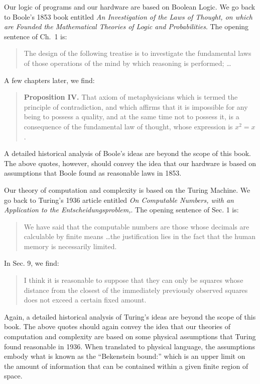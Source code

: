 \documentclass{article}
\begin{document}
Our logic of programs and our hardware are based on Boolean Logic. We go back
to Boole's 1853 book entitled \emph{An Investigation of the Laws of Thought,
  on which are Founded the Mathematical Theories of Logic and
  Probabilities}. The opening sentence of Ch.~1 is:
\begin{quote}
  The design of the following treatise is to investigate the fundamental laws
  of those operations of the mind by which reasoning is performed; \ldots
\end{quote}
A few chapters later, we find:
\begin{quote}
  \textbf{Proposition IV.}  That axiom of metaphysicians which is termed the
  principle of contradiction, and which affirms that it is impossible for any
  being to possess a quality, and at the same time not to possess it, is a
  consequence of the fundamental law of thought, whose expression is $x^2 =
  x$.
\end{quote}
A detailed historical analysis of Boole's ideas are beyond the scope of this
book. The above quotes, however, should convey the idea that our hardware is
based on assumptions that Boole found as reasonable laws in 1853. 

Our theory of computation and complexity is based on the Turing Machine. We
go back to Turing's 1936 article entitled \emph{On Computable Numbers, with
  an Application to the Entscheidungsproblem,}. The opening sentence of
Sec. 1 is:
\begin{quote}
  We have said that the computable numbers are those whose decimals are
  calculable by finite means \ldots the justification lies in the fact that
  the human memory is necessarily limited.
\end{quote}
In Sec. 9, we find:
\begin{quote}
I think it is reasonable to suppose that they can only be squares
whose distance from the closest of the immediately previously observed
squares does not exceed a certain fixed amount.
\end{quote}
Again, a detailed historical analysis of Turing's ideas are beyond the scope
of this book. The above quotes should again convey the idea that our theories
of computation and complexity are based on some physical assumptions that
Turing found reasonable in 1936. When translated to physical language, the
assumptions embody what is known as the ``Bekenstein bound:'' which is an
upper limit on the amount of information that can be contained within a given
finite region of space.
\end{document}
